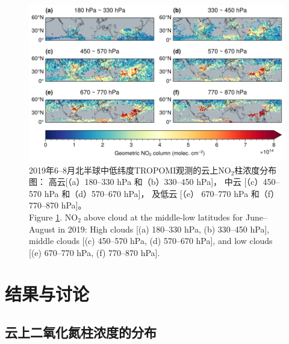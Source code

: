 


\begin{figure}[H]
    \centering
    \includegraphics[width=13cm]{./figures/no2geo_tropomi.png}
    \caption{
    2019年6--8月北半球中低纬度TROPOMI观测的云上NO$_2$柱浓度分布图：
    高云[（a）180--330 hPa 和（b）330--450 hPa]，
    中云 [（c）450--570 hPa 和（d）570--670 hPa]，
    及低云 [（e） 670--770 hPa 和（f）770--870 hPa]。 \\
    Figure \ref{fig:no2geo_tropomi}. NO$_2$ above cloud at the middle-low latitudes for June--August in 2019:
    High clouds [(a) 180--330 hPa, (b) 330--450 hPa],
    middle clouds [(c) 450--570 hPa, (d) 570--670 hPa],
    and low clouds [(e) 670--770 hPa, (f) 770--870 hPa].
    }
    \label{fig:no2geo_tropomi}
\end{figure}

\section{结果与讨论}

\subsection{云上二氧化氮柱浓度的分布} \label{sec:no2_vcd_cld}

